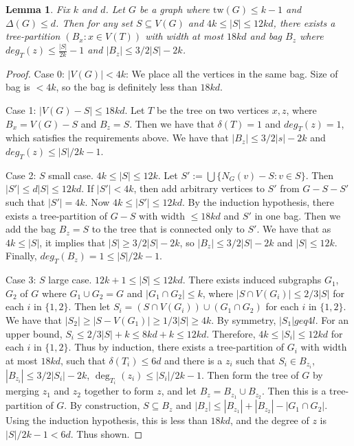 \documentclass[]{article}
\newcommand{\tw}{\text{tw}}
\newtheorem{lemma}[theorem]{Lemma}
\theoremstyle{definition}
\numberwithin{theorem}{section}
\numberwithin{equation}{section}
\begin{document}
\begin{lemma}
	Fix $k$ and $d$. Let $G$ be a graph where $\tw(G) \leq k - 1$ and $\Delta(G) \leq d$. Then for any set $S \subseteq V(G)$ and $4k \leq |S| \leq 12kd$, there exists a tree-partition $\left( B_x : x \in V(T) \right)$ with width at most $18kd$ and bag $B_z$ where $deg_{T}(z) \leq \frac{|S|}{2k} - 1$ and $|B_z| \leq 3/2 |S| - 2k$.
\end{lemma}
\begin{proof}
	
	Case 0: $|V(G)| < 4k$: We place all the vertices in the same bag. Size of bag is $< 4k$, so the bag is definitely less than $18kd$. 
	\par
	Case 1: $|V(G) - S| \leq 18kd$. Let $T$ be the tree on two vertices ${x, z}$, where $B_x = V(G) - S$ and $B_z = S$. Then we have that $\delta(T) = 1$ and $deg_T(z) = 1$, which satisfies the requirements above. We have that $|B_z| \leq 3/2 |s| - 2k$ and $deg_T(z) \leq |S|/2k - 1$. 
	\par
	Case 2: $S$ small case. $4k \leq |S| \leq 12k$. Let $S' := \bigcup \lbrace N_G(v) - S : v \in S \rbrace$. Then $|S'| \leq d |S| \leq 12kd$. If $|S'| < 4k$, then add arbitrary vertices to $S'$ from $G - S - S'$ such that $|S'| = 4k$. Now $4k \leq |S'| \leq 12kd$. By the induction hypothesis, there exists a tree-partition of $G - S$ with width $\leq 18kd$ and $S'$ in one bag. Then we add the bag $B_z = S$ to the tree that is connected only to $S'$. We have that as $4k \leq |S|$, it implies that $|S| \geq 3/2 |S| - 2k$, so $|B_z| \leq 3/2 |S| - 2k$ and $|S| \leq 12k$. Finally, $deg_T(B_z) = 1 \leq |S|/2k - 1$.
	\par
	Case 3: $S$ large case. $12k + 1 \leq |S| \leq 12kd$. There exists induced subgraphs $G_1$, $G_2$ of $G$ where $G_1 \cup G_2 = G$ and $|G_1 \cap G_2| \leq k$, where $|S \cap V (G_i)| \leq 2/3 |S|$ for each $i$ in $\lbrace 1, 2 \rbrace$. Then let $S_i = (S \cap V(G_i)) \cup (G_1 \cap G_2)$ for each $i$ in $\lbrace 1, 2 \rbrace$. We have that $|S_2| \geq |S - V(G_1)| \geq 1/3 |S| \geq 4k$. By symmetry, $|S_1| geq 4l$. For an upper bound, $S_i \leq 2/3 |S| + k \leq 8kd + k \leq 12kd$. Therefore, $4k \leq |S_i| \leq 12kd$ for each $i$ in $\lbrace 1, 2 \rbrace$. Thus by induction, there exists a tree-partition of $G_i$ with width at most $18kd$, such that $\delta(T_i) \leq 6d$ and there is a $z_i$ such that $S_i \in B_{z_i}$, $|B_{z_i}| \leq 3/2 |S_i| - 2k$, $\deg_{T_i}(z_i) \leq |S_i|/2k - 1$. Then form the tree of $G$ by merging $z_1$ and $z_2$ together to form $z$, and let $B_z = B_{z_1} \cup B_{z_2}$. Then this is a tree-partition of $G$. By construction, $S \subseteq B_z$ and $|B_z| \leq |B_{z_1}| + |B_{z_2}| - |G_1 \cap G_2|$. Using the induction hypothesis, this is less than $18kd$, and the degree of $z$ is $|S|/2k - 1 < 6d$. Thus shown.  
\end{proof}
\end{document}
